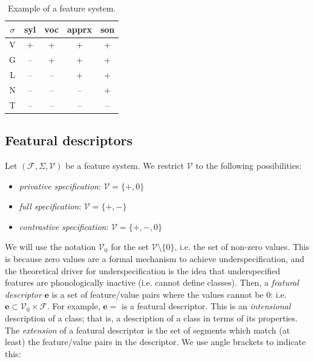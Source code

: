 \documentclass[11pt, oneside]{article}   	%
\begin{document}
\begin{table}[h]
    \centering
    \begin{tabular} {|c||c|c|c|c|}
    \hline
        $\sigma$ & syl & voc & apprx & son \\ \hline
        V & + & + & + & + \\
        G & -- & + & + & + \\
        L & -- & -- & + & + \\
        N & -- & -- & -- & + \\
        T & -- & -- & -- & -- \\
        \hline
    \end{tabular}
    \caption{Example of a feature system.}
    \label{table:featurization}
\end{table}

\subsection{Featural descriptors}

Let $(\mathcal F, \Sigma, \mathcal V)$ be a feature system. We restrict $\mathcal V$ to the following possibilities:
\begin{itemize}
    \item \textit{privative specification}: $\mathcal V = \{ +, 0 \}$
    \item \textit{full specification}: $\mathcal V = \{ +, - \}$
    \item \textit{contrastive specification}: $\mathcal V = \{ +, -, 0 \}$
\end{itemize}

\noindent We will use the notation $\mathcal V_0$ for the set $\mathcal V \setminus \{0\}$, i.e. the set of non-zero values. This is because zero values are a formal mechanism to achieve underspecification, and the theoretical driver for underspecification is the idea that underspecified features are phonologically inactive (i.e. cannot define classes). Then, a \textit{featural descriptor} $\mathbf{e}$ is a set of feature/value pairs where the values cannot be $0$: i.e. $\mathbf{e} \subset \mathcal V_0 \times \mathcal F$. For example, $\mathbf{e} =$   is a featural descriptor. This is an \textit{intensional} description of a class; that is, a description of a class in terms of its properties. The \textit{extension} of a featural descriptor is the set of segments which match (at least) the feature/value pairs in the descriptor. We use angle brackets to indicate this:
\end{document}
